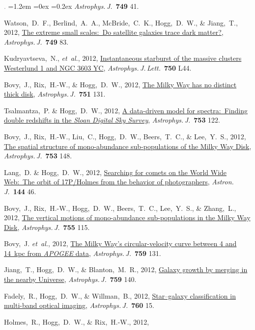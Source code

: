 \documentclass[10pt,letterpaper]{article}
\newcommand{\foreign}[1]{\textsl{#1}}
\newcommand{\etal}{\foreign{et~al.}}
\newcommand{\project}[1]{\textsl{#1}}
\newcommand{\doi}[2]{\href{http://dx.doi.org/#1}{{#2}}}
\newcommand{\deemph}[1]{\textcolor{grey}{\footnotesize{#1}}}
\newcommand{\pubnumber}[1]{\deemph{{#1}.}}
\newcounter{refpubnum}
\newcommand{\hogglist}{%
    \rightmargin=0in
    \leftmargin=1.2em
    \topsep=0ex
    \partopsep=0pt
    \itemsep=0.2ex
    \parsep=0pt
    \itemindent=-1.0\leftmargin
    \listparindent=0.0\leftmargin
    \settowidth{\labelsep}{~}
    \usecounter{refpubnum}
  }
\begin{document}
\begin{list}{\pubnumber{\therefpubnum}}{\hogglist}
\textit{Astrophys.\,J.}\ \textbf{749} 41.
\item
Watson,~D.~F., Berlind,~A.~A., McBride,~C.~K., Hogg,~D.~W., \& Jiang,~T., 2012,
\doi{10.1088/0004-637X/749/1/83}{The extreme small scales:\ Do satellite galaxies trace dark matter?},
\textit{Astrophys.\,J.}\ \textbf{749} 83.
\item
Kudryavtseva,~N., \etal, 2012,
\doi{10.1088/2041-8205/750/2/L44}{Instantaneous starburst of the massive clusters Westerlund 1 and NGC 3603 YC},
\textit{Astrophys.\,J.\,Lett.}\ \textbf{750} L44.
\item
Bovy,~J., Rix,~H.-W., \& Hogg,~D.~W., 2012,
\doi{10.1088/0004-637X/751/2/131}{The Milky Way has no distinct thick disk},
\textit{Astrophys.\,J.}\ \textbf{751} 131.
\item
Tsalmantza,~P. \& Hogg,~D.~W., 2012,
\doi{10.1088/0004-637X/753/2/122}{A data-driven model for spectra:\ Finding double redshifts in the \project{Sloan Digital Sky Survey}},
\textit{Astrophys.\,J.}\ \textbf{753} 122.
\item
Bovy,~J., Rix,~H.-W., Liu,~C., Hogg,~D.~W., Beers,~T.~C., \& Lee,~Y.~S., 2012,
\doi{10.1088/0004-637X/753/2/148}{The spatial structure of mono-abundance sub-populations of the Milky Way Disk},
\textit{Astrophys.\,J.}\ \textbf{753} 148.
\item
Lang,~D. \& Hogg,~D.~W., 2012,
\doi{10.1088/0004-6256/144/2/46}{Searching for comets on the World Wide Web:\ The orbit of 17P/Holmes from the behavior of photographers},
\textit{Astron.\,J.}\ \textbf{144} 46.
\item
Bovy,~J., Rix,~H.-W., Hogg,~D.~W., Beers,~T.~C., Lee,~Y.~S., \& Zhang,~L., 2012,
\doi{10.1088/0004-637X/755/2/115}{The vertical motions of mono-abundance sub-populations in the Milky Way Disk},
\textit{Astrophys.\,J.}\ \textbf{755} 115.
\item
Bovy,~J. \etal, 2012,
\doi{10.1088/0004-637X/759/2/131}{The Milky Way's circular-velocity curve between 4 and 14~kpc from \project{APOGEE} data},
\textit{Astrophys.\,J.}\ \textbf{759} 131.
\item
Jiang,~T., Hogg,~D.~W., \& Blanton,~M.~R., 2012,
\doi{10.1088/0004-637X/759/2/140}{Galaxy growth by merging in the nearby Universe},
\textit{Astrophys.\,J.}\ \textbf{759} 140.
\item
Fadely,~R., Hogg,~D.~W., \& Willman,~B., 2012,
\doi{10.1088/0004-637X/760/1/15}{Star--galaxy classification in multi-band optical imaging},
\textit{Astrophys.\,J.}\ \textbf{760} 15.
\item
Holmes,~R., Hogg,~D.~W., \& Rix,~H.-W., 2012,

\end{list}
\end{document}
